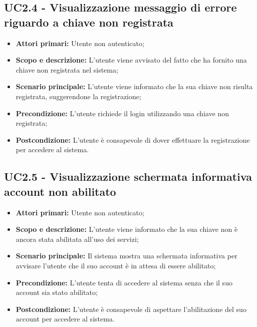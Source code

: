 \documentclass[AnalisiDeiRequisiti.tex]{subfiles}
\begin{document}
\subsection{UC2.4 - Visualizzazione messaggio di errore riguardo a chiave non registrata}
\begin{itemize}
	\item \textbf{Attori primari:} Utente non autenticato;\\
	\item \textbf{Scopo e descrizione:} L'utente viene avvisato del fatto che ha fornito una chiave non registrata nel sistema;\\
	\item \textbf{Scenario principale:} L'utente viene informato che la sua chiave non risulta registrata, suggerendone la registrazione;\\
	\item \textbf{Precondizione:} L'utente richiede il login utilizzando una chiave non registrata;\\
	\item \textbf{Postcondizione:} L'utente è consapevole di dover effettuare la registrazione per accedere al sistema.\\
\end{itemize}
\subsection{UC2.5 - Visualizzazione schermata informativa account non abilitato}
\begin{itemize}
	\item \textbf{Attori primari:} Utente non autenticato;
	\item \textbf{Scopo e descrizione:} L'utente viene informato che la sua chiave non è ancora stata abilitata all'uso dei servizi;
	\item \textbf{Scenario principale:} Il sistema mostra una schermata informativa per avvisare l'utente che il suo account è in attesa di essere abilitato;
	\item \textbf{Precondizione:} L'utente tenta di accedere al sistema senza che il suo account sia stato abilitato; 
	\item \textbf{Postcondizione:} L'utente è consapevole di aspettare l'abilitazione del suo account per accedere al sistema.
\end{itemize}
\end{document}
